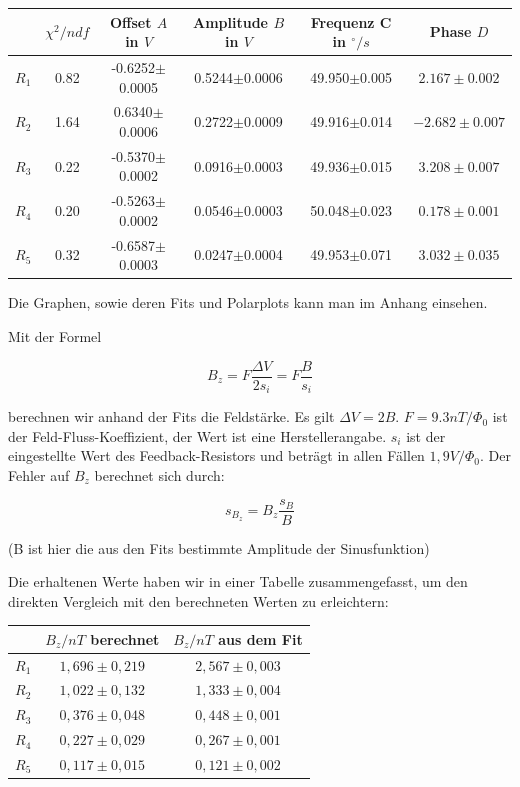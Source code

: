 \begin{tabular}[H]{| c | c | c | c | c | c |} \hline
 & $\chi^2 / ndf$ & Offset $A$ in $V$ & Amplitude $B$ in $V$ & Frequenz C in $^\circ/s$ & Phase $D$ \\ 
\hline
$R_1$ & 0.82 & -0.6252$\pm$0.0005 & 0.5244$\pm$0.0006 & 49.950$\pm$0.005 & $2.167 \pm 0.002$\\
$R_2$ & 1.64 & 0.6340$\pm$0.0006 & 0.2722$\pm$0.0009 & 49.916$\pm$0.014 & $-2.682 \pm 0.007$\\
$R_3$ & 0.22 & -0.5370$\pm$0.0002 & 0.0916$\pm$0.0003 & 49.936$\pm$0.015 & $3.208 \pm 0.007$\\
$R_4$ & 0.20 & -0.5263$\pm$0.0002 & 0.0546$\pm$0.0003 & 50.048$\pm$0.023 & $0.178 \pm 0.001$\\
$R_5$ & 0.32 & -0.6587$\pm$0.0003 & 0.0247$\pm$0.0004 & 49.953$\pm$0.071 & $3.032 \pm 0.035$\\ \hline
\end{tabular}

Die Graphen, sowie deren Fits und Polarplots kann man im Anhang einsehen.

Mit der Formel 

$$ B_z = F \frac{\Delta V}{2s_i} = F\frac{B}{s_i} $$

berechnen wir anhand der Fits die Feldstärke. Es gilt $\Delta V = 2B$. $F = 9.3 nT / \Phi_0$ ist der Feld-Fluss-Koeffizient, der Wert ist eine Herstellerangabe. $s_i$ ist der eingestellte Wert des Feedback-Resistors und beträgt in allen Fällen $1,9 V/ \Phi_0$. Der Fehler auf $B_z$ berechnet sich durch:

$$ s_{B_z} = B_z\frac{s_B}{B} $$

(B ist hier die aus den Fits bestimmte Amplitude der Sinusfunktion)
 
Die erhaltenen Werte haben wir in einer Tabelle zusammengefasst, um den direkten Vergleich mit den berechneten Werten zu erleichtern:

\begin{center}
\begin{tabular}[H]{| c | c | c |} \hline
 & $B_z / nT$ berechnet & $B_z / nT$ aus dem Fit\\ \hline \hline
 $R_1$ & $1,696 \pm 0,219$ & $2,567\pm 0,003$\\
 $R_2$ & $1,022 \pm 0,132$ & $1,333\pm 0,004$\\
 $R_3$ & $0,376 \pm 0,048$ & $0,448\pm 0,001$\\
 $R_4$ & $0,227 \pm 0,029$ & $0,267\pm 0,001$\\
 $R_5$ & $0,117 \pm 0,015$ & $0,121\pm 0,002$\\ \hline
 \end{tabular}
 \end{center}
 
